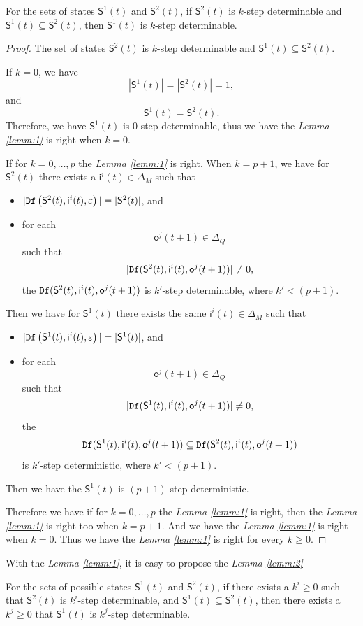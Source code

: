\begin{lemma}
For the sets of states $\mathsf{S}^{1}(t)$ and $\mathsf{S}^{2}(t)$, if $\mathsf{S}^{2}(t)$ is $k$-step determinable and $\mathsf{S}^{1}(t)\subseteq \mathsf{S}^{2}(t)$, then $\mathsf{S}^{1}(t)$ is $k$-step determinable.
  \label{lemm:1}
\end{lemma}
\begin{proof}
The set of states $\mathsf{S}^{2}(t)$ is $k$-step determinable and $\mathsf{S}^{1}(t)\subseteq \mathsf{S}^{2}(t)$. 

If $k=0$, we have \[|\mathsf{S}^{1}(t)|=|\mathsf{S}^{2}(t)|=1,\] and \[\mathsf{S}^{1}(t) = \mathsf{S}^{2}(t).\] Therefore, we have $\mathsf{S}^{1}(t)$ is $0$-step determinable, thus we have the {\em Lemma \ref{lemm:1}} is right when $k=0$.
 
 If for $k=0,\ldots, p$ the {\em Lemma \ref{lemm:1}} is right. When $k=p+1$, we have for $\mathsf{S}^{2}(t)$ there exists a $\mathsf{i}^{i}(t)\in \Delta_M$ such that
 \begin{itemize}
 \item  $|{\tt Df}\left(\mathsf{S}^{2}(t),\mathsf{i}^{i}(t),\varepsilon\right)|=|\mathsf{S}^{2}(t)|$, and 
 \item  for each \[\mathsf{o}^{j}(t+1)\in \Delta_Q\] such that \[|{\tt Df}(\mathsf{S}^{2}(t),\mathsf{i}^{i}(t),\mathsf{o}^{j}(t+1))|\neq 0,\] the ${\tt Df}(\mathsf{S}^{2}(t),\mathsf{i}^{i}(t),\mathsf{o}^{j}(t+1))$ is $k'$-step determinable, where ${k'}<(p+1)$.
 \end{itemize}
 Then we have for $\mathsf{S}^{1}(t)$ there exists the same $\mathsf{i}^{i}(t)\in \Delta_M$ such that
 \begin{itemize}
 \item  $|{\tt Df}\left(\mathsf{S}^{1}(t),\mathsf{i}^{i}(t),\varepsilon\right)|=|\mathsf{S}^{1}(t)|$, and 
 \item  for each \[\mathsf{o}^{j}(t+1)\in \Delta_Q\] such that \[|{\tt Df}(\mathsf{S}^{1}(t),\mathsf{i}^{i}(t),\mathsf{o}^{j}(t+1))|\neq 0,\] the \[{\tt Df}(\mathsf{S}^{1}(t),\mathsf{i}^{i}(t),\mathsf{o}^{j}(t+1))\subseteq {\tt Df}(\mathsf{S}^{2}(t),\mathsf{i}^{i}(t),\mathsf{o}^{j}(t+1))\] is  $k'$-step deterministic, where ${k'}<(p+1)$.
 \end{itemize}  Then we have the $\mathsf{S}^{1}(t)$ is $(p+1)$-step deterministic. 
 
 Therefore we have if for $k=0,\ldots, p$ the {\em Lemma \ref{lemm:1}} is right, then the {\em Lemma \ref{lemm:1}} is right too when $k=p+1$. 
And we have the {\em Lemma \ref{lemm:1}} is right when $k=0$. Thus we have the {\em Lemma \ref{lemm:1}} is right for every $k\ge0$.
 
\end{proof}
With the {\em Lemma \ref{lemm:1}}, it is easy to propose the {\em Lemma \ref{lemm:2}}
\begin{lemma}
For the sets of possible states $\mathsf{S}^{1}(t)$ and $\mathsf{S}^{2}(t)$, if there exists a $k^{i}\ge 0$ such that $\mathsf{S}^{2}(t)$ is $k^{i}$-step determinable, and $\mathsf{S}^{1}(t)\subseteq \mathsf{S}^{2}(t)$, then there exists a $k^{j}\ge 0$ that $\mathsf{S}^{1}(t)$ is $k^{j}$-step determinable.
\label{lemm:2}
\end{lemma}

